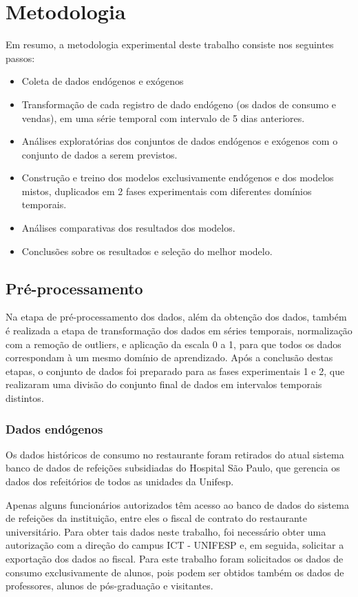 
\chapter{Metodologia} \label{cap:metodos}
    Em resumo, a metodologia experimental deste trabalho consiste nos seguintes passos:
    \begin{itemize}
        \item Coleta de dados endógenos e exógenos
        \item Transformação de cada registro de dado endógeno (os dados de consumo e vendas), em uma série temporal com intervalo de 5 dias anteriores.
        \item Análises exploratórias dos conjuntos de dados endógenos e exógenos com o conjunto de dados a serem previstos.
        \item Construção e treino dos modelos exclusivamente endógenos e dos modelos mistos, duplicados em 2 fases experimentais com diferentes domínios temporais.
        \item Análises comparativas dos resultados dos modelos.
        \item Conclusões sobre os resultados e seleção do melhor modelo.
    \end{itemize}
    
	\section{Pré-processamento}
	    Na etapa de pré-processamento dos dados, além da obtenção dos dados, também é realizada a etapa de transformação dos dados em séries temporais, normalização com a remoção de outliers, e aplicação da escala 0 a 1, para que todos os dados correspondam à um mesmo domínio de aprendizado.
	    Após a conclusão destas etapas, o conjunto de dados foi preparado para as fases experimentais 1 e 2, que realizaram uma divisão do conjunto final de dados em intervalos temporais distintos.
	    
	    \subsection{Dados endógenos}
        	Os dados históricos de consumo no restaurante foram retirados do atual sistema banco de dados de refeições subsidiadas do Hospital São Paulo, que gerencia os dados dos refeitórios de todos as unidades da Unifesp.
        	
        	Apenas alguns funcionários autorizados têm acesso ao banco de dados do sistema de refeições da instituição, entre eles o fiscal de contrato do restaurante universitário. Para obter tais dados neste trabalho, foi necessário obter uma autorização com a direção do campus ICT - UNIFESP e, em seguida, solicitar a exportação dos dados ao fiscal. Para este trabalho foram solicitados os dados de consumo exclusivamente de alunos, pois podem ser obtidos também os dados de professores, alunos de pós-graduação e visitantes. 
    
